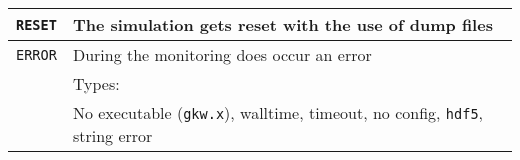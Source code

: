 \begin{center}
\begin{tabular}{l | l}
        \texttt{RESET}    & The simulation gets reset with the use of dump files                                            \\\hline 
        \texttt{ERROR}    & During the monitoring does occur an error                                                       \\
                          & Types:                                                                                          \\
                          & No executable (\texttt{gkw.x}), walltime, timeout, no config, \texttt{hdf5}, string error       \\
    \end{tabular}
    \label{tab:statusTypes}
\end{center}

